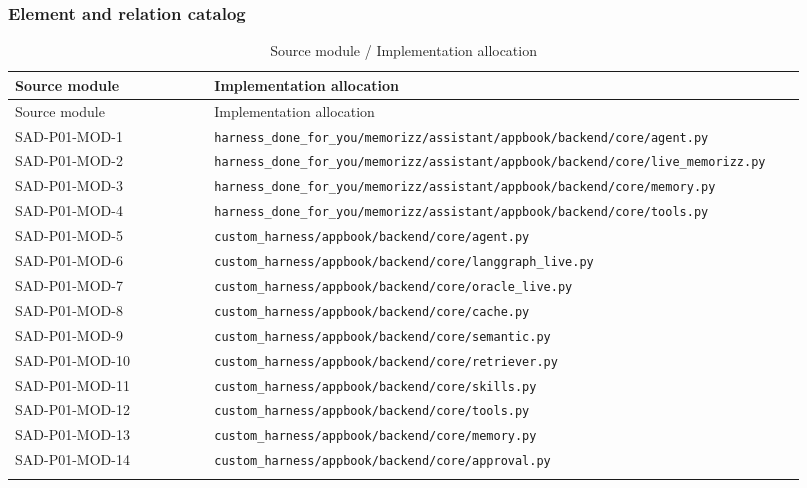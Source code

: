 \documentclass[10pt,letterpaper]{article}
\begin{document}
\subsubsection{Element and relation catalog}
\begin{longtable}{@{}>{\raggedright\arraybackslash}p{0.24\linewidth}>{\raggedright\arraybackslash}p{0.68\linewidth}@{}}
\caption{Source module / Implementation allocation}\\
\toprule Source module & Implementation allocation\\\midrule\endfirsthead
\toprule Source module & Implementation allocation\\\midrule\endhead
SAD-P01-MOD-1 & \nolinkurl{harness_done_for_you/memorizz/assistant/appbook/backend/core/agent.py}\\\addlinespace
SAD-P01-MOD-2 & \nolinkurl{harness_done_for_you/memorizz/assistant/appbook/backend/core/live_memorizz.py}\\\addlinespace
SAD-P01-MOD-3 & \nolinkurl{harness_done_for_you/memorizz/assistant/appbook/backend/core/memory.py}\\\addlinespace
SAD-P01-MOD-4 & \nolinkurl{harness_done_for_you/memorizz/assistant/appbook/backend/core/tools.py}\\\addlinespace
SAD-P01-MOD-5 & \nolinkurl{custom_harness/appbook/backend/core/agent.py}\\\addlinespace
SAD-P01-MOD-6 & \nolinkurl{custom_harness/appbook/backend/core/langgraph_live.py}\\\addlinespace
SAD-P01-MOD-7 & \nolinkurl{custom_harness/appbook/backend/core/oracle_live.py}\\\addlinespace
SAD-P01-MOD-8 & \nolinkurl{custom_harness/appbook/backend/core/cache.py}\\\addlinespace
SAD-P01-MOD-9 & \nolinkurl{custom_harness/appbook/backend/core/semantic.py}\\\addlinespace
SAD-P01-MOD-10 & \nolinkurl{custom_harness/appbook/backend/core/retriever.py}\\\addlinespace
SAD-P01-MOD-11 & \nolinkurl{custom_harness/appbook/backend/core/skills.py}\\\addlinespace
SAD-P01-MOD-12 & \nolinkurl{custom_harness/appbook/backend/core/tools.py}\\\addlinespace
SAD-P01-MOD-13 & \nolinkurl{custom_harness/appbook/backend/core/memory.py}\\\addlinespace
SAD-P01-MOD-14 & \nolinkurl{custom_harness/appbook/backend/core/approval.py}\\\addlinespace

\end{longtable}
\end{document}
